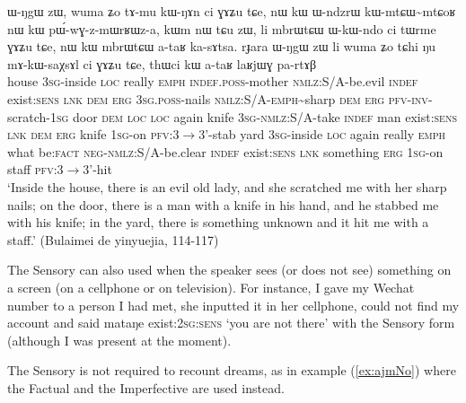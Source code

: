 \documentclass[oldfontcommands,oneside,a4paper,11pt]{article}
\newcommand{\ipa}[1]{{\phon \mbox{#1}}} %
\newcommand{\refb}[1]{(\ref{#1})}
\newcommand{\rdp}{\textasciitilde{}}
\begin{document}
\begin{exe}
\ex \label{ex:bulaimei}
\gll \ipa{kha}	\ipa{ɯ-ŋgɯ}	\ipa{zɯ,}	\ipa{wuma}	\ipa{ʑo}	\ipa{tɤ-mu}	\ipa{kɯ-ŋɤn}	\ipa{ci}	\ipa{ɣɤʑu}	\ipa{tɕe,} \ipa{nɯ}	\ipa{kɯ}	\ipa{ɯ-ndzrɯ}	\ipa{kɯ-mtɕɯ\rdp{}mtɕoʁ}	\ipa{nɯ}	\ipa{kɯ}	\ipa{pɯ́-wɣ-z-mɯrʁɯz-a,} \ipa{kɯm}	\ipa{nɯ} \ipa{tɕu}	\ipa{zɯ,}	\ipa{li}	\ipa{mbrɯtɕɯ}	\ipa{ɯ-kɯ-ndo}	\ipa{ci}	\ipa{tɯrme}	\ipa{ɣɤʑu}	\ipa{tɕe,}	\ipa{nɯ}	\ipa{kɯ}	\ipa{mbrɯtɕɯ}	\ipa{a-taʁ}	\ipa{ka-sɤtsa.}  \ipa{rɟara}	\ipa{ɯ-ŋgɯ}	\ipa{zɯ}	\ipa{li}	\ipa{wuma}	\ipa{ʑo}	\ipa{tɕhi}	\ipa{ŋu}	\ipa{mɤ-kɯ-saχsɤl}	\ipa{ci}	\ipa{ɣɤʑu}	\ipa{tɕe,}	\ipa{thɯci}	\ipa{kɯ}	\ipa{a-taʁ}	\ipa{laʁjɯɣ}	\ipa{pa-rtɤβ} \\
house \textsc{3sg}-inside \textsc{loc} really \textsc{emph} \textsc{indef.poss}-mother \textsc{nmlz}:S/A-be.evil \textsc{indef} exist:\textsc{sens} \textsc{lnk} \textsc{dem} \textsc{erg} \textsc{3sg.poss}-nails \textsc{nmlz}:S/A-\textsc{emph}\rdp{}sharp \textsc{dem} \textsc{erg} \textsc{pfv-inv}-scratch-\textsc{1sg} door \textsc{dem} \textsc{loc}  \textsc{loc} again knife \textsc{3sg-nmlz}:S/A-take \textsc{indef} man exist:\textsc{sens} \textsc{lnk} \textsc{dem} \textsc{erg} knife \textsc{1sg}-on \textsc{pfv}:3$\rightarrow$3'-stab yard \textsc{3sg}-inside \textsc{loc} again really \textsc{emph} what be:\textsc{fact} \textsc{neg-nmlz}:S/A-be.clear \textsc{indef} exist:\textsc{sens} \textsc{lnk} something \textsc{erg}  \textsc{1sg}-on staff \textsc{pfv}:3$\rightarrow$3'-hit \\
\glt `Inside the house, there is an evil old lady, and she scratched me with her sharp nails; on the door, there is a man with a knife in his hand, and he stabbed me with his knife; in the yard, there is something unknown and it hit me with a staff.'  (Bulaimei de yinyuejia, 114-117)
\end{exe}

The Sensory can also used when the speaker sees (or does not see) something on a screen (on a cellphone or on television). For instance, I gave my Wechat number to a person I had met, she inputted it in her cellphone, could not find my account and said \ipa{mataŋe} exist:\textsc{2sg:sens} `you are not there' with the Sensory form (although I was present at the moment).

The Sensory is not required to recount dreams, as in example \refb{ex:ajmNo} where the Factual and the Imperfective are used instead.
\end{document}
